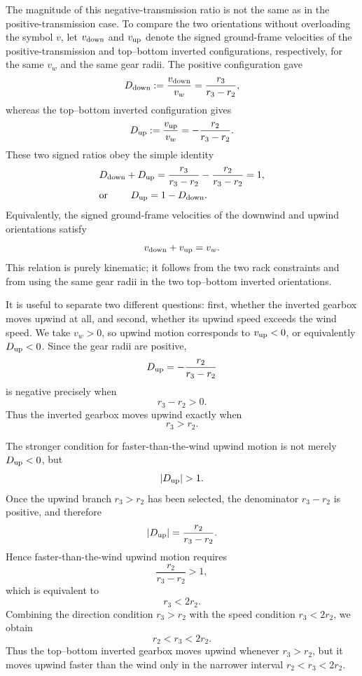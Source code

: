 \documentclass[reprint,aps,pra,longbibliography]{revtex4-2}
\begin{document}
The magnitude of this negative-transmission ratio is not the same as in the
positive-transmission case.  To compare the two orientations without
overloading the symbol \(v\), let \(v_{\rm down}\) and \(v_{\rm up}\) denote
the signed ground-frame velocities of the positive-transmission and
top--bottom inverted configurations, respectively, for the same \(v_w\) and
the same gear radii.  The positive configuration gave
\[
D_{\rm down}
:=
\frac{v_{\rm down}}{v_w}
=
\frac{r_3}{r_3-r_2},
\]
whereas the top--bottom inverted configuration gives
\[
D_{\rm up}
:=
\frac{v_{\rm up}}{v_w}
=
-\frac{r_2}{r_3-r_2}.
\]
These two signed ratios obey the simple identity
\begin{align}
&D_{\rm down} + D_{\rm up}
=
\frac{r_3}{r_3-r_2}
-
\frac{r_2}{r_3-r_2}
=1,
\nonumber\\
&\text{or }\qquad
D_{\rm up}=1-D_{\rm down}.
\label{eq:upwind-downwind-symmetry}
\end{align}
Equivalently, the signed ground-frame velocities of the downwind and upwind
orientations satisfy
\[
v_{\rm down}+v_{\rm up}=v_w .
\]
This relation is purely kinematic; it follows from the two rack constraints
and from using the same gear radii in the two top--bottom inverted
orientations.

It is useful to separate two different questions: first, whether the inverted
gearbox moves upwind at all, and second, whether its upwind speed exceeds the
wind speed.  We take \(v_w>0\), so upwind motion corresponds to \(v_{\rm up}<0\), or
equivalently \(D_{\rm up}<0\).  Since the gear radii are positive,
\[
D_{\rm up}
=
-\frac{r_2}{r_3-r_2}
\]
is negative precisely when
\[
r_3-r_2>0.
\]
Thus the inverted gearbox moves upwind exactly when
\[
r_3>r_2 .
\]

The stronger condition for faster-than-the-wind upwind motion is not merely
\(D_{\rm up}<0\), but
\[
|D_{\rm up}|>1 .
\]
Once the upwind branch \(r_3>r_2\) has been selected, the denominator
\(r_3-r_2\) is positive, and therefore
\[
|D_{\rm up}|
=
\frac{r_2}{r_3-r_2}.
\]
Hence faster-than-the-wind upwind motion requires
\[
\frac{r_2}{r_3-r_2}>1,
\]
which is equivalent to
\[
r_3<2r_2 .
\]
Combining the direction condition \(r_3>r_2\) with the speed condition
\(r_3<2r_2\), we obtain
\begin{equation}
r_2<r_3<2r_2 .
\label{eq:upwind-amplification-condition}
\end{equation}
Thus the top--bottom inverted gearbox moves upwind whenever \(r_3>r_2\), but
it moves upwind faster than the wind only in the narrower interval
\(r_2<r_3<2r_2\).
\end{document}
